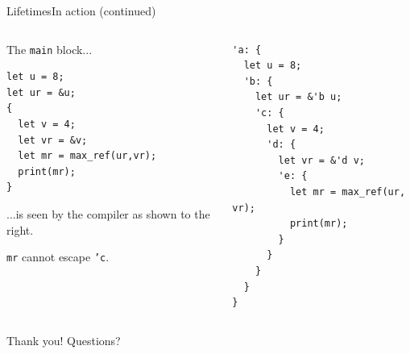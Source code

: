 \documentclass[xcolor=x11names,compress]{beamer}
\renewcommand{\(}{\begin{columns}}
\renewcommand{\)}{\end{columns}}
\newcommand{\<}[1]{\begin{column}{#1}}
\renewcommand{\>}{\end{column}}
\begin{document}
\begin{frame}[fragile]{Lifetimes}{In action (continued)}

\begin{columns}[T]
\begin{column}{.37\textwidth}
The \texttt{main} block...
\begin{lstlisting}[basicstyle=\footnotesize\ttfamily,numbers=none]
let u = 8;
let ur = &u;
{
  let v = 4;
  let vr = &v;
  let mr = max_ref(ur,vr);
  print(mr);
}
\end{lstlisting}
...is seen by the compiler as shown to the right.

\texttt{mr} cannot escape \texttt{'c}.
\end{column}
\hfill
\begin{column}{.61\textwidth}
\begin{lstlisting}[basicstyle=\footnotesize\ttfamily,numbers=none]
'a: {
  let u = 8;
  'b: {
    let ur = &'b u;
    'c: {
      let v = 4;
      'd: {
        let vr = &'d v;
        'e: {
          let mr = max_ref(ur, vr);
          print(mr);
        }
      }
    }
  }
}
\end{lstlisting}
\end{column}
\end{columns}
\end{frame}

\begin{frame}{Thank you!}
Questions?
\end{frame}
\end{document}
